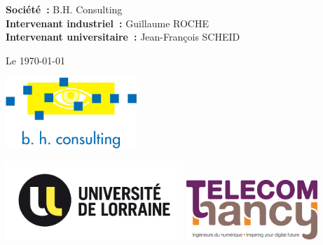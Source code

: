 \documentclass[12pt]{article}
\begin{document}
\begin{center}
	{\Huge\textbf{\titreA}}

	\vspace{1cm}

	{\huge\emph{\titreB}}

	\vspace{1cm}

	\begin{flushleft}
		{\large
		\hspace{3.2cm}
		\textbf{Société~:} B.H. Consulting\\
		\hspace{3.2cm}
		\textbf{Intervenant industriel~:} Guillaume ROCHE\\
		\hspace{3.2cm}
		\textbf{Intervenant universitaire~:} Jean-François SCHEID
		}
	\end{flushleft}

	\vspace{1cm}
	{\large Le \today}

	\vspace{1.5cm}

	\includegraphics[width=140pt]{img/BHConsulting.jpg}

	\vspace{1.5cm}

	\includegraphics[width=190pt]{img/ul.png}
	\hspace{3.5cm}
	\includegraphics[width=140pt]{img/telecom-nancy.jpg}
\end{center}
\newpage

\thispagestyle{empty}
\tableofcontents
\newpage
\end{document}
